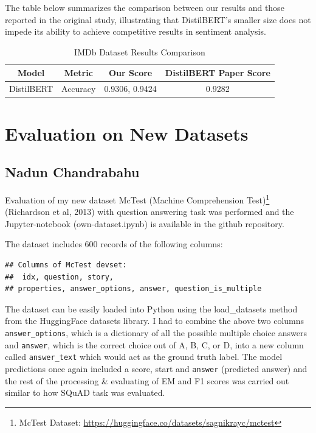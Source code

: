 \documentclass[
  11pt,
]{article}
\begin{document}
The table below summarizes the comparison between our results and those reported in the original study, illustrating that DistilBERT’s smaller size does not impede its ability to achieve competitive results in sentiment analysis.

\begin{table}[h]
\centering
\caption{IMDb Dataset Results Comparison}
\begin{tabular}{|c|c|c|c|}
\hline
\textbf{Model} & \textbf{Metric} & \textbf{Our Score} & \textbf{DistilBERT Paper Score} \\
\hline
DistilBERT & Accuracy & 0.9306, 0.9424 & 0.9282 \\
\hline
\end{tabular}
\label{tab:imdb_results}
\end{table}


\section{Evaluation on New Datasets}\label{evaluation-on-new-datasets}

\subsection{Nadun Chandrabahu}\label{nadun-chandrabahu}

Evaluation of my new dataset McTest (Machine Comprehension
Test)\footnote{McTest Dataset:
  \url{https://huggingface.co/datasets/sagnikrayc/mctest}} (Richardson
et al, 2013) with question answering task was performed and the
Jupyter-notebook (own-dataset.ipynb) is available in the github
repository.

The dataset includes 600 records of the following columns:

\begin{verbatim}
## Columns of McTest devset:
##  idx, question, story,
## properties, answer_options, answer, question_is_multiple
\end{verbatim}

The dataset can be easily loaded into Python using the load\_datasets
method from the HuggingFace datasets library. I had to combine the above
two columns \texttt{answer\_options}, which is a dictionary of all the
possible multiple choice answers and \texttt{answer}, which is the
correct choice out of A, B, C, or D, into a new column called
\texttt{answer\_text} which would act as the ground truth label. The
model predictions once again included a score, start and \texttt{answer}
(predicted answer) and the rest of the processing \& evaluating of EM
and F1 scores was carried out similar to how SQuAD task was evaluated.
\end{document}
